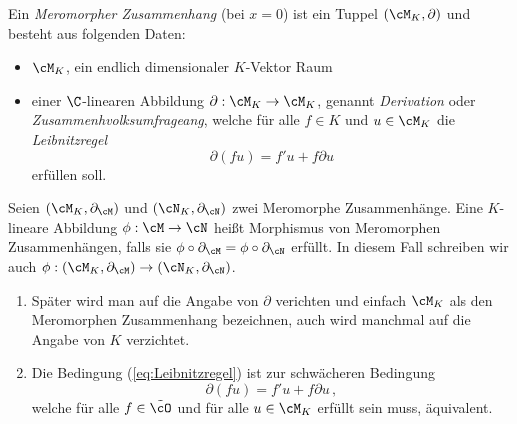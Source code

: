\begin{defn} \label{def:merom-zush}
Ein \emph{Meromorpher Zusammenhang} (bei $x=0$) ist ein Tuppel
$(\cM_K,\partial)$ und besteht aus folgenden Daten:
\begin{itemize}
\item $\cM_K$, ein endlich dimensionaler $K$-Vektor Raum
\item einer $\C$-linearen Abbildung $\partial:\cM_K\rightarrow \cM_K$,
genannt \emph{Derivation} oder \emph{Zusammenhvolksumfrageang}, welche für alle $f\in K$
und $u\in \cM_K$ die
\emph{Leibnitzregel}
\begin{equation}\label{eq:Leibnitzregel}
\partial(fu)=f'u+f\partial u
\end{equation}
erfüllen soll.
\end{itemize}
\end{defn}

\begin{defn}
Seien $(\cM_K,\partial_\cM)$ und $(\cN_K,\partial_\cN)$ zwei Meromorphe
Zusammenhänge. Eine $K$-lineare Abbildung $\phi:\cM\rightarrow\cN$ heißt
Morphismus von Meromorphen Zusammenhängen, falls sie
$\phi\circ\partial_\cM=\phi\circ\partial_\cN$ erfüllt. In diesem Fall schreiben
wir auch $\phi:(\cM_K,\partial_\cM)\rightarrow(\cN_K,\partial_\cN)$.
\end{defn}

\begin{bem}
\begin{enumerate}
\item Später wird man auf die Angabe von $\partial$ verichten und einfach
$\cM_K$ als den Meromorphen Zusammenhang bezeichnen, auch wird manchmal auf die
Angabe von $K$ verzichtet.
\item \cite[Rem 5.1.2.]{hotta2007d}
Die Bedingung (\ref{eq:Leibnitzregel}) ist zur schwächeren Bedingung
\[
\partial(fu)=f'u+f\partial u \,,
\]
welche für alle $f\in \tilde\cO$ und für alle $u\in \cM_K$ erfüllt sein muss,
äquivalent.
\end{enumerate}
\end{bem}


